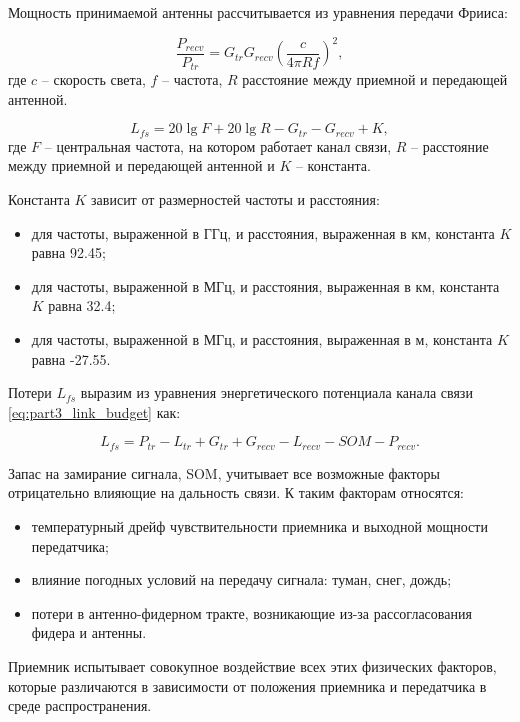 
Мощность принимаемой антенны рассчитывается из уравнения передачи Фрииса:

\begin{equation}
  \label{eq:part1_Friis}
  \frac{P_{recv}}{P_{tr}} = G_{tr}G_{recv}\left(\frac{c}{4\pi R f} \right)^2,
\end{equation}
где
$c$ --  скорость света,
$f$ -- частота, 
$R$ расстояние между приемной и передающей антенной.

\begin{equation}
  \label{eq:part3_L_fs}
  L_{fs} = 20 \lg{F} + 20\lg{R} - G_{tr} - G_{recv} + K,
  \end{equation}
где $F$ -- центральная частота, на котором работает канал связи, $R$ -- расстояние между приемной и передающей антенной и $K$ -- константа.

Константа $K$ зависит от размерностей частоты и расстояния:

\begin{itemize}
  \item для частоты, выраженной в ГГц, и расстояния, выраженная в км, константа $K$ равна 92.45;
  \item для частоты, выраженной в МГц, и расстояния, выраженная в км, константа $K$ равна 32.4;
  \item для частоты, выраженной в МГц, и расстояния, выраженная в м, константа $K$ равна -27.55.
\end{itemize} 

Потери $L_{fs}$ выразим из уравнения энергетического потенциала канала связи \cref{eq:part3_link_budget} как:

\begin{equation}
  \label{eq:part3_L_fs_from_link_budget}
  L_{fs} = P_{tr} - L_{tr} + G_{tr} + G_{recv} - L_{recv} - SOM - P_{recv}.
\end{equation}


Запас на замирание сигнала, SOM,  учитывает все возможные факторы отрицательно влияющие на дальность связи. К таким факторам относятся:

\begin{itemize}
  \item температурный дрейф чувствительности приемника и выходной мощности передатчика;
  \item влияние погодных условий на передачу сигнала: туман, снег, дождь;
  \item  потери в антенно-фидерном тракте, возникающие из-за рассогласования фидера и антенны.
\end{itemize}
Приемник испытывает совокупное воздействие всех этих физических факторов, которые различаются в зависимости от положения приемника и передатчика в среде распространения. 

